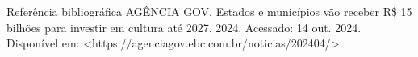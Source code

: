 \begin{frame}{Referência bibliográfica}
    AGÊNCIA GOV. Estados e municípios vão receber R\$ 15 bilhões para investir em cultura até 2027. 2024. Acessado: 14
out. 2024. Disponível em: <https://agenciagov.ebc.com.br/noticias/202404/>.
\end{frame}